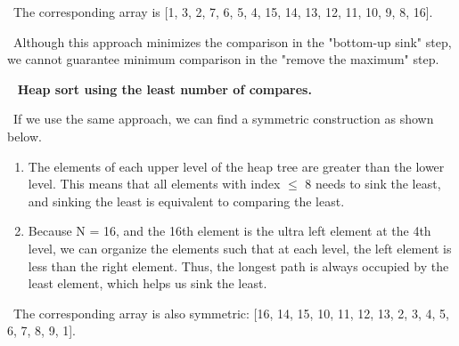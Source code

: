 \documentclass[11pt]{article}
\begin{document}
~\newline\noindent The corresponding array is [1, 3, 2, 7, 6, 5, 4, 15, 14, 13, 12, 11, 10, 9, 8, 16].

~\newline\noindent Although this approach minimizes the comparison in the "bottom-up sink" step, we cannot guarantee minimum comparison in the  "remove the maximum" step. 

~\newline\noindent 
\textbf{Heap sort using the least number of compares.}

~\newline\noindent If we use the same approach, we can find a symmetric construction as shown below.

\begin{enumerate}
\item The elements of each upper level of the heap tree are greater than the lower level. This means that all elements with index $\le$ 8 needs to sink the least, and sinking the least is equivalent to comparing the least.

\item Because N = 16, and the 16th element is the ultra left element at the 4th level, we can organize the elements such that at each level, the left element is less than the right element. Thus, the longest path is always occupied by the least element, which helps us sink the least.
\end{enumerate}

~\newline\noindent The corresponding array is also symmetric: [16, 14, 15, 10, 11, 12, 13, 2, 3, 4, 5, 6, 7, 8, 9, 1].
\end{document}
